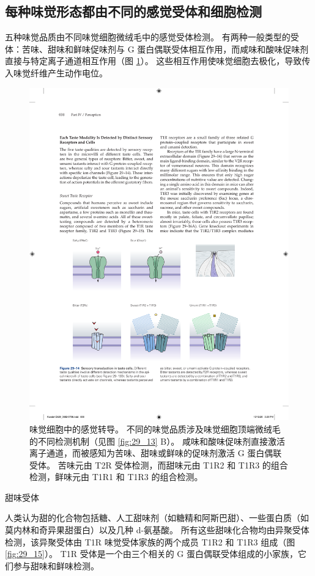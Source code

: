 \subsection{每种味觉形态都由不同的感觉受体和细胞检测}
五种味觉品质由不同味觉细胞微绒毛中的感觉受体检测。 
有两种一般类型的受体：苦味、甜味和鲜味促味剂与 G 蛋白偶联受体相互作用，而咸味和酸味促味剂直接与特定离子通道相互作用（图 \ref{fig:29_14}）。 
这些相互作用使味觉细胞去极化，导致传入味觉纤维产生动作电位。

\begin{figure}[htbp]
	\centering
	\includegraphics[width=0.75\linewidth]{chap29/fig_29_14}
	\caption{味觉细胞中的感觉转导。 不同的味觉品质涉及味觉细胞顶端微绒毛的不同检测机制（见图 \ref{fig:29_13} B）。 咸味和酸味促味剂直接激活离子通道，而被感知为苦味、甜味或鲜味的促味剂激活 G 蛋白偶联受体。 苦味元由 T2R 受体检测，而甜味元由 T1R2 和 T1R3 的组合检测，鲜味元由 T1R1 和 T1R3 的组合检测。}
	\label{fig:29_14}
\end{figure}

甜味受体

人类认为甜的化合物包括糖、人工甜味剂（如糖精和阿斯巴甜）、一些蛋白质（如莫内林和奇异果甜蛋白）以及几种 d-氨基酸。 
所有这些甜味化合物均由异聚受体检测，该异聚受体由 T1R 味觉受体家族的两个成员 T1R2 和 T1R3 组成（图 \ref{fig:29_15}）。 
T1R 受体是一个由三个相关的 G 蛋白偶联受体组成的小家族，它们参与甜味和鲜味检测。

